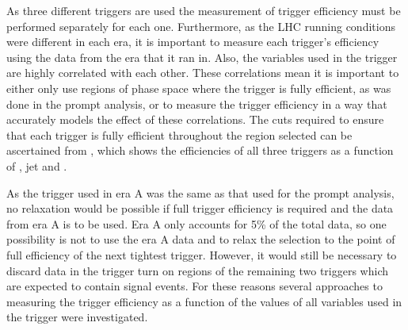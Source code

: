 As three different triggers are used the measurement of trigger efficiency must be performed separately for each one. Furthermore, as the LHC running conditions were different in each era, it is important to measure each trigger's efficiency using the data from the era that it ran in. Also, the variables used in the trigger are highly correlated with each other. These correlations mean it is important to either only use regions of phase space where the trigger is fully efficient, as was done in the prompt analysis, or to measure the trigger efficiency in a way that accurately models the effect of these correlations. The cuts required to ensure that each trigger is fully efficient throughout the region selected can be ascertained from , which shows the efficiencies of all three triggers as a function of \METnoMU, jet \pt and \Mjj.

As the trigger used in era A was the same as that used for the prompt analysis, no relaxation would be possible if full trigger efficiency is required and the data from era A is to be used. Era A only accounts for 5\% of the total data, so one possibility is not to use the era A data and to relax the selection to the point of full efficiency of the next tightest trigger. However, it would still be necessary to discard data in the trigger turn on regions of the remaining two triggers which are expected to contain signal events. For these reasons several approaches to measuring the trigger efficiency as a function of the values of all variables used in the trigger were investigated.

